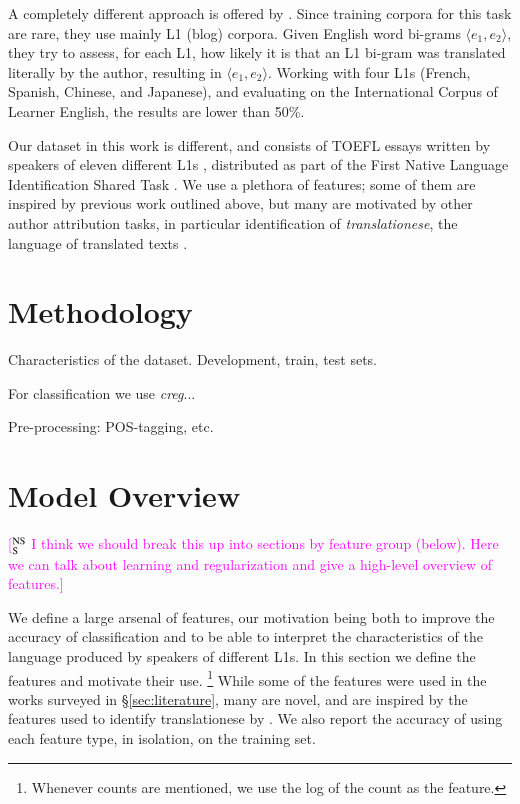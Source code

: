 \documentclass[11pt,letterpaper]{article}
\newcommand{\ensuretext}[1]{#1}
\newcommand{\nssmarker}{\ensuretext{\textcolor{magenta}{\ensuremath{^{\textsc{NS}}_{\textsc{S}}}}}}
\newcommand{\arkcomment}[3]{\ensuretext{\textcolor{#3}{[#1 #2]}}}
\newcommand{\nss}[1]{\arkcomment{\nssmarker}{#1}{magenta}}
\newcommand{\Sref}[1]{\S\ref{#1}}
\begin{document}
A completely different approach is offered by
\citet{brooke2011native}. Since training corpora for this task are
rare, they use mainly L1 (blog) corpora. Given English word bi-grams
$\langle e_1,e_2\rangle$, they try to assess, for each L1, how likely
it is that an L1 bi-gram was translated literally by the author,
resulting in $\langle e_1,e_2\rangle$. Working with four L1s (French,
Spanish, Chinese, and Japanese), and evaluating on the International
Corpus of Learner English, the results are lower than 50\%.

Our dataset in this work is different, and consists of TOEFL essays
written by speakers of eleven different L1s
\citep{blanchard-tetreault-higgins-cahill-chodorow:2013:TOEFL11-RR},
distributed as part of the First Native Language Identification Shared
Task \citep{tetreault-blanchard-cahill:2013:BEA}. We use a plethora of
features; some of them are inspired by previous work outlined above,
but many are motivated by other author attribution tasks, in
particular identification of \emph{translationese}, the language of
translated texts \citep{vered:noam:shuly}.

\section{Methodology}
\label{sec:methodology}
Characteristics of the dataset. Development, train, test sets.

For classification we use \emph{creg}...

Pre-processing: POS-tagging, etc.

\section{Model Overview}

\nss{I think we should break this up into sections by feature group (below). 
Here we can talk about learning and regularization and give a high-level overview 
of features.}

We define a large arsenal of features, our motivation being both to
improve the accuracy of classification and to be able to interpret the
characteristics of the language produced by speakers of different
L1s. In this section we define the features and motivate their use.%
\footnote{Whenever counts are mentioned, we use the log of the count
  as the feature.}  
While some of the features were used in the works surveyed in
\Sref{sec:literature}, many are novel, and are inspired by the
features used to identify translationese by \citet{vered:noam:shuly}.
We also report the accuracy of using each feature type, in isolation,
on the training set.
\end{document}
